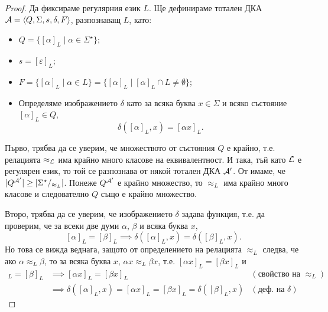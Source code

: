\begin{proof}
  Да фиксираме регулярния език $L$.
  Ще дефинираме тотален ДКА $\mathcal{A} = \langle{Q,\Sigma,s,\delta,F}\rangle$, разпознаващ $L$, като:
  \begin{itemize}
  \item
    $Q = \{[\alpha]_L\mid \alpha\in \Sigma^\star\}$;
  \item
    $s = [\varepsilon]_L$;
  \item
    $F = \{[\alpha]_L\mid \alpha\in L\} = \{[\alpha]_L \mid [\alpha]_L \cap L \neq \emptyset\}$;
  \item
    Определяме изображението $\delta$ като 
    за всяка буква $x \in \Sigma$ и всяко състояние $[\alpha]_L\in Q$, 
    \[\delta([\alpha]_L,x) = [\alpha x]_L.\]
  \end{itemize}
  
  Първо, трябва да се уверим, че множеството от състояния $Q$ е крайно, т.е.
  релацията $\approx_{\mathcal{L}}$ има крайно много класове на еквивалентност.
  И така, тъй като $\mathcal{L}$ е регулярен език, то той се разпознава от някой тотален ДКА $\mathcal{A}'$.
  От  имаме, че $\lvert{Q^{\mathcal{A}'}}\rvert \geq \lvert{\Sigma^\star/_{\approx_L}}\rvert$.
  Понеже $Q^{\mathcal{A}'}$ е крайно множество, то $\approx_L$ има крайно много класове и 
  следователно $Q$ също е крайно множество.

  Второ, трябва да се уверим, че изображението $\delta$ задава функция, т.е. 
  да проверим, че за всеки две думи $\alpha$, $\beta$ и всяка буква $x$,
  \[[\alpha]_L = [\beta]_L \implies \delta([\alpha]_L,x) = \delta([\beta]_L,x).\]
  Но това се вижда веднага, защото от определението на релацията $\approx_L$ следва, че
  ако $\alpha \approx_L \beta$, то за всяка буква $x$, $\alpha x \approx_L \beta x$,
  т.е. $[\alpha x]_L = [\beta x]_L$ и 
  \begin{align*}
    [\alpha]_L = [\beta]_L & \implies [\alpha x]_L = [\beta x]_L & (\text{свойство на }\approx_L)\\
    & \implies \delta([\alpha]_L,x) = [\alpha x]_L = [\beta x]_L = \delta([\beta]_L,x) & (\text{деф. на }\delta)
  \end{align*}
  

\end{proof}
